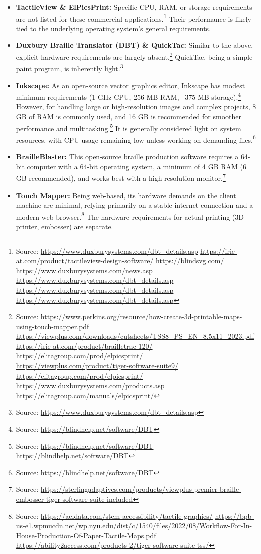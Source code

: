 \begin{itemize}
    \item \textbf{TactileView \& ElPicsPrint:} Specific CPU, RAM, or storage requirements are not listed for these commercial applications.\footnote{Source:  \url{https://www.duxburysystems.com/dbt_details.asp} \url{https://irie-at.com/product/tactileview-design-software/} \url{https://blindsvg.com/} \url{https://www.duxburysystems.com/news.asp} \url{https://www.duxburysystems.com/dbt_details.asp} \url{https://www.duxburysystems.com/dbt_details.asp} \url{https://www.duxburysystems.com/dbt_details.asp}} Their performance is likely tied to the underlying operating system's general requirements.
    \item \textbf{Duxbury Braille Translator (DBT) \& QuickTac:} Similar to the above, explicit hardware requirements are largely absent.\footnote{Source:  \url{https://www.perkins.org/resource/how-create-3d-printable-maps-using-touch-mapper.pdf} \url{https://viewplus.com/downloads/cutsheets/TSS8_PS_EN_8.5x11_2023.pdf} \url{https://irie-at.com/product/brailletrac-120/} \url{https://elitagroup.com/prod/elpicsprint/} \url{https://viewplus.com/product/tiger-software-suite9/} \url{https://elitagroup.com/prod/elpicsprint/} \url{https://www.duxburysystems.com/products.asp} \url{https://elitagroup.com/manuals/elpicsprint/}} QuickTac, being a simple paint program, is inherently light.\footnote{Source:  \url{https://www.duxburysystems.com/dbt_details.asp}}
    \item \textbf{Inkscape:} As an open-source vector graphics editor, Inkscape has modest minimum requirements (1 GHz CPU, 256 MB RAM, ~375 MB storage).\footnote{Source:  \url{https://blindhelp.net/software/DBT}} However, for handling large or high-resolution images and complex projects, 8 GB of RAM is commonly used, and 16 GB is recommended for smoother performance and multitasking.\footnote{Source:  \url{https://blindhelp.net/software/DBT} \url{https://blindhelp.net/software/DBT}} It is generally considered light on system resources, with CPU usage remaining low unless working on demanding files.\footnote{Source:  \url{https://blindhelp.net/software/DBT}}
    \item \textbf{BrailleBlaster:} This open-source braille production software requires a 64-bit computer with a 64-bit operating system, a minimum of 4 GB RAM (6 GB recommended), and works best with a high-resolution monitor.\footnote{Source:  \url{https://sterlingadaptives.com/products/viewplus-premier-braille-embosser-tiger-software-suite-included}}
    \item \textbf{Touch Mapper:} Being web-based, its hardware demands on the client machine are minimal, relying primarily on a stable internet connection and a modern web browser.\footnote{Source:  \url{https://aeldata.com/stem-accessibility/tactile-graphics/} \url{https://bpb-us-e1.wpmucdn.net/wp.nyu.edu/dist/c/1540/files/2022/08/Workflow-For-In-House-Production-Of-Paper-Tactile-Maps.pdf} \url{https://ability2access.com/products-2/tiger-software-suite-tss/}} The hardware requirements for actual printing (3D printer, embosser) are separate.
\end{itemize}

